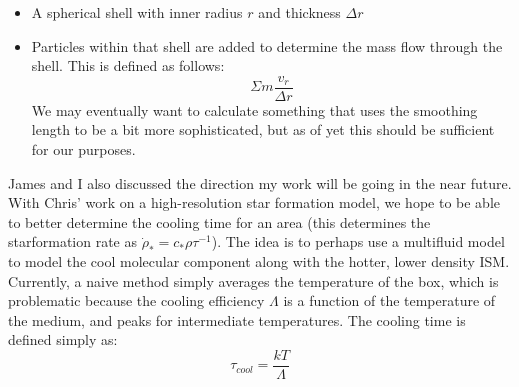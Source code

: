 \documentclass[11pt,letterpaper]{article}
\begin{document}
\begin{itemize}
\item
  A spherical shell with inner radius $r$ and thickness $\Delta r$
\item
  Particles within that shell are added to determine the mass flow
  through the shell. This is defined as follows:
  \[\Sigma m \frac{v_r}{\Delta r}\] We may eventually want to calculate
  something that uses the smoothing length to be a bit more
  sophisticated, but as of yet this should be sufficient for our
  purposes.
\end{itemize}

James and I also discussed the direction my work will be going in the
near future. With Chris' work on a high-resolution star formation model,
we hope to be able to better determine the cooling time for an area
(this determines the starformation rate as
$\dot\rho_* = c_*\rho\tau^{-1}$). The idea is to perhaps use a
multifluid model to model the cool molecular component along with the
hotter, lower density ISM. Currently, a naive method simply averages the
temperature of the box, which is problematic because the cooling
efficiency $\Lambda$ is a function of the temperature of the medium, and
peaks for intermediate temperatures. The cooling time is defined simply
as: \[\tau_{cool} = \frac{kT}{\Lambda}\]
\end{document}
